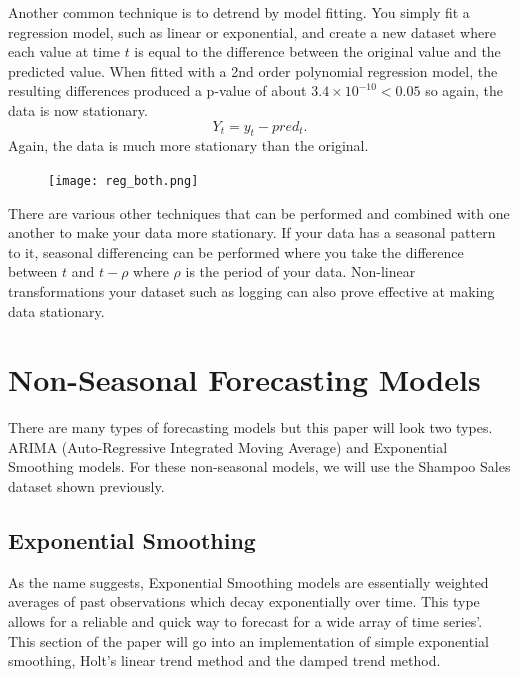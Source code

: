\documentclass{article}
\begin{document}
    Another common technique is to detrend by model fitting. You simply fit a regression model, such as linear or exponential, and create a new dataset where each value at time $t$ is equal to the difference between the original value and the predicted value.
    When fitted with a 2nd order polynomial regression model, the resulting differences produced a p-value of about $3.4 \times 10^{-10}< 0.05$ so again, the data is now stationary.
    \begin{equation*}
      Y_t = y_t - pred_t.
    \end{equation*}
    Again, the data is much more stationary than the original.
    \begin{figure}[H]
      \centering
      \texttt{[image: reg\_both.png]}
      \caption{}
    \end{figure}
    There are various other techniques that can be performed and combined with one another to make your data more stationary.
    If your data has a seasonal pattern to it, seasonal differencing can be performed where you take the difference between $t$ and $t-\rho$ where $\rho$ is the period of your data.
    Non-linear transformations your dataset such as logging can also prove effective at making data stationary.
  
  \newpage
  
  \section{Non-Seasonal Forecasting Models}
    There are many types of forecasting models but this paper will look two types. ARIMA (Auto-Regressive Integrated Moving Average) and Exponential Smoothing models. For these non-seasonal models, we will use the Shampoo Sales dataset shown previously.

  \subsection{Exponential Smoothing}
    As the name suggests, Exponential Smoothing models are essentially weighted averages of past observations which decay exponentially over time. This type allows for a reliable and quick way to forecast for a wide array of time series'. This section of the paper will go into an implementation of simple exponential smoothing, Holt's linear trend method and the damped trend method.
\end{document}

